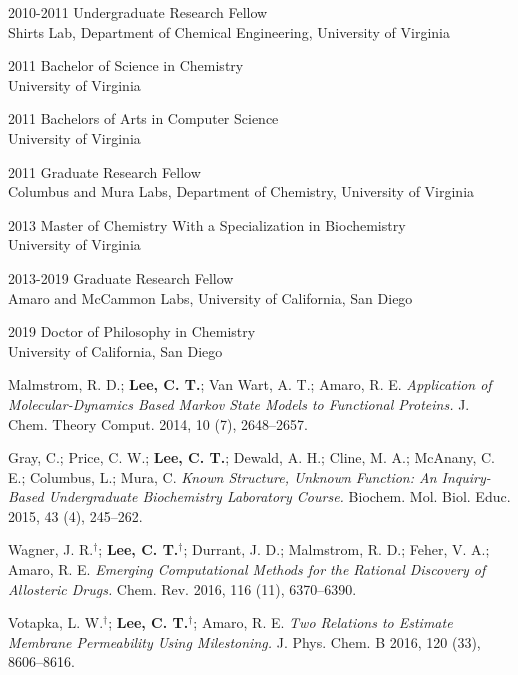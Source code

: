 \begin{frontmatter}
%
%
\begin{vitapage}
\begin{vita}
  \item[2010-2011] Undergraduate Research Fellow\\ Shirts Lab, Department of Chemical Engineering, University of Virginia
  \item[2011] Bachelor of Science in Chemistry\\University of Virginia
  \item[2011] Bachelors of Arts in Computer Science\\
  University of Virginia
  \item[2011] Graduate Research Fellow\\
  Columbus and Mura Labs, Department of Chemistry, University of Virginia
  \item[2013] Master of Chemistry With a Specialization in Biochemistry\\ University of Virginia
  \item[2013-2019] Graduate Research Fellow\\ Amaro and McCammon Labs, University of California, San Diego
  \item[2019] Doctor of Philosophy in Chemistry\\ University of California, San Diego
\end{vita}
\begin{publications}
  \item Malmstrom, R. D.; \textbf{Lee, C. T.}; Van Wart, A. T.; Amaro, R. E. \emph{Application of Molecular-Dynamics Based Markov State Models to Functional Proteins.} J. Chem. Theory Comput. 2014, 10 (7), 2648–2657.
  \item Gray, C.; Price, C. W.; \textbf{Lee, C. T.}; Dewald, A. H.; Cline, M. A.; McAnany, C. E.; Columbus, L.; Mura, C. \emph{Known Structure, Unknown Function: An Inquiry-Based Undergraduate Biochemistry Laboratory Course.} Biochem. Mol. Biol. Educ. 2015, 43 (4), 245–262.
  \item Wagner, J. R.$^{\dagger}$; \textbf{Lee, C. T.$^{\dagger}$}; Durrant, J. D.; Malmstrom, R. D.; Feher, V. A.; Amaro, R. E. \emph{Emerging Computational Methods for the Rational Discovery of Allosteric Drugs.} Chem. Rev. 2016, 116 (11), 6370–6390.
  \item Votapka, L. W.$^{\dagger}$; \textbf{Lee, C. T.$^{\dagger}$}; Amaro, R. E. \emph{Two Relations to Estimate Membrane Permeability Using Milestoning.} J. Phys. Chem. B 2016, 120 (33), 8606–8616.

\end{publications}
\end{vitapage}
\end{frontmatter}
